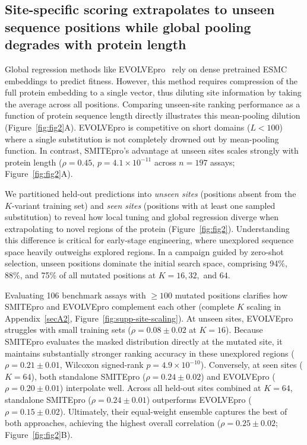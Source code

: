 \documentclass[sn-nature]{sn-jnl}
\begin{document}
\subsection{Site-specific scoring extrapolates to unseen sequence positions while global pooling degrades with protein length}

Global regression methods like EVOLVEpro~\cite{jiang2024rapid} rely on dense pretrained ESMC embeddings to predict fitness. However, this method requires compression of the full protein embedding to a single vector, thus diluting site information by taking the average across all positions. Comparing unseen-site ranking performance as a function of protein sequence length directly illustrates this mean-pooling dilution (Figure~\ref{fig:fig2}A). EVOLVEpro is competitive on short domains ($L < 100$) where a single substitution is not completely drowned out by mean-pooling function. In contrast, SMITEpro's advantage at unseen sites scales strongly with protein length ($\rho = 0.45$, $p = 4.1 \times 10^{-11}$ across $n = 197$ assays; Figure~\ref{fig:fig2}A).

We partitioned held-out predictions into \textit{unseen sites} (positions absent from the $K$-variant training set) and \textit{seen sites} (positions with at least one sampled substitution) to reveal how local tuning and global regression diverge when extrapolating to novel regions of the protein (Figure~\ref{fig:fig2}). Understanding this difference is critical for early-stage engineering, where unexplored sequence space heavily outweighs explored regions. In a campaign guided by zero-shot selection, unseen positions dominate the initial search space, comprising 94\%, 88\%, and 75\% of all mutated positions at $K = 16, 32,$ and $64$.

Evaluating 106 benchmark assays with $\ge 100$ mutated positions clarifies how SMITEpro and EVOLVEpro complement each other (complete $K$ scaling in Appendix~\ref{secA2}, Figure~\ref{fig:supp-site-scaling}). At unseen sites, EVOLVEpro struggles with small training sets ($\rho = 0.08 \pm 0.02$ at $K = 16$). Because SMITEpro evaluates the masked distribution directly at the mutated site, it maintains substantially stronger ranking accuracy in these unexplored regions ($\rho = 0.21 \pm 0.01$, Wilcoxon signed-rank $p = 4.9 \times 10^{-10}$). Conversely, at seen sites ($K = 64$), both standalone SMITEpro ($\rho = 0.24 \pm 0.02$) and EVOLVEpro ($\rho = 0.20 \pm 0.01$) interpolate well. Across all held-out sites combined at $K = 64$, standalone SMITEpro ($\rho = 0.24 \pm 0.01$) outperforms EVOLVEpro ($\rho = 0.15 \pm 0.02$). Ultimately, their equal-weight ensemble captures the best of both approaches, achieving the highest overall correlation ($\rho = 0.25 \pm 0.02$; Figure~\ref{fig:fig2}B).
\end{document}
